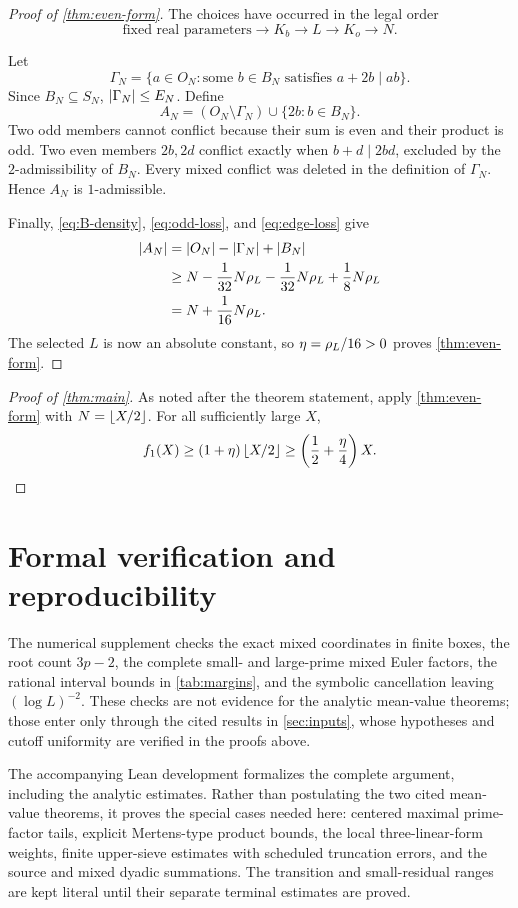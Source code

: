 \documentclass[11pt]{article}
\begin{document}
\begin{proof}[Proof of \cref{thm:even-form}]
The choices have occurred in the legal order
\[
 \text{fixed real parameters}
 \longrightarrow K_b
 \longrightarrow L
 \longrightarrow K_o
 \longrightarrow N.
\]

Let
\[
 \Gamma_N=
 \{a\in O_N:\text{some }b\in B_N
 \text{ satisfies }a+2b\mid ab\}.
\]
Since \(B_N\subseteq S_N\), \(\left|\Gamma_N\right|\leq E_N\). Define
\[
 A_N=(O_N\setminus\Gamma_N)\cup\{2b:b\in B_N\}.
\]
Two odd members cannot conflict because their sum is even and their product
is odd. Two even members \(2b,2d\) conflict exactly when
\(b+d\mid2bd\), excluded by the \(2\)-admissibility of \(B_N\). Every mixed
conflict was deleted in the definition of \(\Gamma_N\). Hence \(A_N\) is
\(1\)-admissible.

Finally, \eqref{eq:B-density}, \eqref{eq:odd-loss}, and
\eqref{eq:edge-loss} give
\[
\begin{aligned}
 \left|A_N\right|
 &=\left|O_N\right|-\left|\Gamma_N\right|+\left|B_N\right|\\
 &\geq
 N-\frac1{32}N\rho_L-\frac1{32}N\rho_L
 +\frac18N\rho_L\\
 &=N+\frac1{16}N\rho_L.
\end{aligned}
\]
The selected \(L\) is now an absolute constant, so
\(\eta=\rho_L/16>0\) proves \cref{thm:even-form}.
\end{proof}

\begin{proof}[Proof of \cref{thm:main}]
As noted after the theorem statement, apply \cref{thm:even-form} with
\(N=\left\lfloor X/2\right\rfloor\). For all sufficiently large \(X\),
\[
 f_1(X)\geq (1+\eta)\left\lfloor X/2\right\rfloor
 \geq\left(\frac12+\frac{\eta}{4}\right)X.
\]
\end{proof}

\section{Formal verification and reproducibility}

The numerical supplement checks the exact mixed coordinates in finite boxes,
the root count \(3p-2\), the complete small- and large-prime mixed Euler
factors, the rational interval bounds in \cref{tab:margins}, and the symbolic
cancellation leaving \((\log L)^{-2}\). These checks are not evidence for the
analytic mean-value theorems; those enter only through the cited results in
\cref{sec:inputs}, whose hypotheses and cutoff uniformity are verified in the
proofs above.

The accompanying Lean development formalizes the complete argument, including
the analytic estimates. Rather than postulating the two cited mean-value
theorems, it proves the special cases needed here: centered maximal
prime-factor tails, explicit Mertens-type product bounds, the local
three-linear-form weights, finite upper-sieve estimates with scheduled
truncation errors, and the source and mixed dyadic summations. The transition
and small-residual ranges are kept literal until their separate terminal
estimates are proved.
\end{document}

